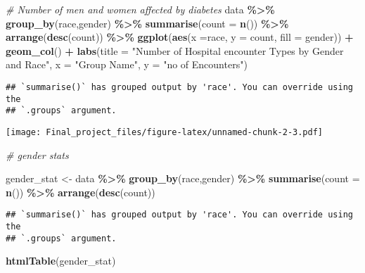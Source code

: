 \documentclass[
]{article}
\newenvironment{Shaded}{\begin{snugshade}}{\end{snugshade}}
\newcommand{\AttributeTok}[1]{\textcolor[rgb]{0.13,0.29,0.53}{#1}}
\newcommand{\CommentTok}[1]{\textcolor[rgb]{0.56,0.35,0.01}{\textit{#1}}}
\newcommand{\FunctionTok}[1]{\textcolor[rgb]{0.13,0.29,0.53}{\textbf{#1}}}
\newcommand{\NormalTok}[1]{#1}
\newcommand{\OtherTok}[1]{\textcolor[rgb]{0.56,0.35,0.01}{#1}}
\newcommand{\SpecialCharTok}[1]{\textcolor[rgb]{0.81,0.36,0.00}{\textbf{#1}}}
\newcommand{\StringTok}[1]{\textcolor[rgb]{0.31,0.60,0.02}{#1}}
\begin{document}
\begin{Shaded}
\begin{Highlighting}[]
\CommentTok{\# Number of men and women affected by diabetes }
\NormalTok{data }\SpecialCharTok{\%\textgreater{}\%}  \FunctionTok{group\_by}\NormalTok{(race,gender) }\SpecialCharTok{\%\textgreater{}\%} \FunctionTok{summarise}\NormalTok{(}\AttributeTok{count =} \FunctionTok{n}\NormalTok{()) }\SpecialCharTok{\%\textgreater{}\%}  \FunctionTok{arrange}\NormalTok{(}\FunctionTok{desc}\NormalTok{(count)) }\SpecialCharTok{\%\textgreater{}\%}
  \FunctionTok{ggplot}\NormalTok{(}\FunctionTok{aes}\NormalTok{(}\AttributeTok{x =}\NormalTok{race, }\AttributeTok{y =}\NormalTok{ count, }\AttributeTok{fill =}\NormalTok{ gender)) }\SpecialCharTok{+}
  \FunctionTok{geom\_col}\NormalTok{() }\SpecialCharTok{+}
  \FunctionTok{labs}\NormalTok{(}\AttributeTok{title =} \StringTok{"Number of Hospital encounter Types by Gender and Race"}\NormalTok{, }\AttributeTok{x =} \StringTok{"Group Name"}\NormalTok{, }\AttributeTok{y =} \StringTok{"no of Encounters"}\NormalTok{)}
\end{Highlighting}
\end{Shaded}

\begin{verbatim}
## `summarise()` has grouped output by 'race'. You can override using the
## `.groups` argument.
\end{verbatim}

\texttt{[image: Final\_project\_files/figure-latex/unnamed-chunk-2-3.pdf]}

\begin{Shaded}
\begin{Highlighting}[]
\CommentTok{\# gender stats }

\NormalTok{gender\_stat }\OtherTok{\textless{}{-}}\NormalTok{ data }\SpecialCharTok{\%\textgreater{}\%}  \FunctionTok{group\_by}\NormalTok{(race,gender) }\SpecialCharTok{\%\textgreater{}\%} \FunctionTok{summarise}\NormalTok{(}\AttributeTok{count =} \FunctionTok{n}\NormalTok{()) }\SpecialCharTok{\%\textgreater{}\%}  \FunctionTok{arrange}\NormalTok{(}\FunctionTok{desc}\NormalTok{(count))}
\end{Highlighting}
\end{Shaded}

\begin{verbatim}
## `summarise()` has grouped output by 'race'. You can override using the
## `.groups` argument.
\end{verbatim}

\begin{Shaded}
\begin{Highlighting}[]
\FunctionTok{htmlTable}\NormalTok{(gender\_stat)}
\end{Highlighting}
\end{Shaded}
\end{document}
